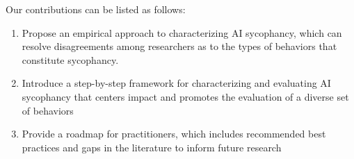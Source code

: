 Our contributions can be listed as follows:

\begin{enumerate}
    \item Propose an empirical approach to characterizing AI sycophancy, which can resolve disagreements among researchers as to the types of behaviors that constitute sycophancy.
    \item Introduce a step-by-step framework for characterizing and evaluating AI sycophancy that centers impact and promotes the evaluation of a diverse set of behaviors
    \item Provide a roadmap for practitioners, which includes recommended best practices and gaps in the literature to inform future research
\end{enumerate}


    